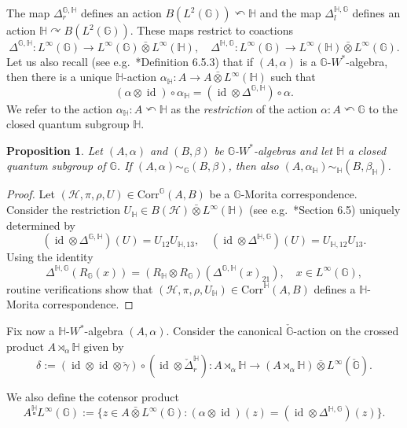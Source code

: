 \documentclass[reqno]{amsart}
\numberwithin{equation}{section}
\newtheorem{Prop}[Theorem]{Proposition}
\DeclareMathOperator{\id}{\mathrm{id}}
\newcommand{\G}{\mathbb{G}}
\newcommand{\Corr}{\mathrm{Corr}}
\newcommand{\ovot}{\bar{\otimes}}
\begin{document}
 The map $\Delta_r^{\G, \mathbb{H}}$ defines an action $B(L^2(\G))\curvearrowleft \mathbb{H}$ and the map $\Delta_l^{\mathbb{H}, \G}$ defines an action $\mathbb{H}\curvearrowright B(L^2(\G))$. These maps restrict to coactions
 $$\Delta^{\G, \mathbb{H}}: L^\infty(\G)\to L^\infty(\G)\ovot L^\infty(\mathbb{H}), \quad \Delta^{\mathbb{H}, \G}: L^\infty(\G)\to L^\infty(\mathbb{H}) \ovot L^\infty(\G).$$
 Let us also recall (see e.g.\ \cite{DC09}*{Definition 6.5.3}) that if $(A, \alpha)$ is a $\G$-$W^*$-algebra, then there is a unique $\mathbb{H}$-action $\alpha_\mathbb{H}: A \to A \ovot L^\infty(\mathbb{H})$ such that 
 $$(\alpha \otimes \id)\circ \alpha_{\mathbb{H}}= (\id \otimes \Delta^{\G, \mathbb{H}})\circ\alpha.$$
We refer to the action $\alpha_{\mathbb{H}}: A \curvearrowleft \mathbb{H}$ as the \emph{restriction} of the action $\alpha: A \curvearrowleft \G$ to the closed quantum subgroup $\mathbb{H}$.
\begin{Prop}
    Let $(A, \alpha)$ and $(B, \beta)$ be $\G$-$W^*$-algebras and let $\mathbb{H}$ a closed quantum subgroup of $\G$. If $(A, \alpha)\sim_\G (B,\beta)$, then also $(A, \alpha_{\mathbb{H}})\sim_{\mathbb{H}} (B, \beta_{\mathbb{H}})$.
\end{Prop}
\begin{proof}
Let $(\mathcal{H}, \pi, \rho, U)\in \Corr^\G(A,B)$ be a $\G$-Morita correspondence. Consider the restriction $U_\mathbb{H}\in B(\mathcal{H})\ovot L^\infty(\mathbb{H})$ (see e.g.\ \cite{DC09}*{Section 6.5}) uniquely determined by
$$(\id \otimes \Delta^{\G, \mathbb{H}})(U) = U_{12} U_{\mathbb{H},13}, \quad (\id \otimes \Delta^{\mathbb{H}, \G})(U) = U_{\mathbb{H},12} U_{13}.$$ 
Using the identity
$$\Delta^{\mathbb{H}, \G}(R_\G(x))= (R_\mathbb{H}\otimes R_\G) (\Delta^{\G, \mathbb{H}}(x)_{21}), \quad x \in L^\infty(\G),$$
routine verifications show that $(\mathcal{H}, \pi, \rho, U_\mathbb{H}) \in \Corr^\mathbb{H}(A,B)$ defines a $\mathbb{H}$-Morita correspondence. 
\end{proof}


 Fix now a $\mathbb{H}$-$W^*$-algebra $(A, \alpha)$. Consider the canonical $\check{\G}$-action on the crossed product $A\rtimes_\alpha \mathbb{H}$ given by
 $$\delta:= (\id \otimes \id \otimes \check{\gamma})\circ (\id \otimes \check{\Delta}_r^{\mathbb{H}}): A\rtimes_\alpha \mathbb{H}\to (A\rtimes_\alpha \mathbb{H})\ovot L^\infty(\check{\G}).$$

 We also define the cotensor product 
   $$A \overset{\mathbb{H}}{\square} L^\infty(\G):= \{z \in A \ovot L^\infty(\G): (\alpha \otimes \id)(z) = (\id \otimes \Delta^{\mathbb{H}, \G})(z)\}.$$
\end{document}

